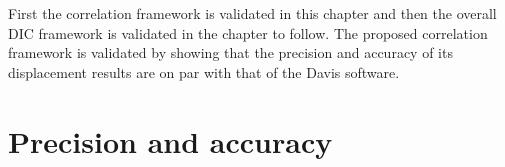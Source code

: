 \documentclass[12pt,oneside,openany,a4paper, %
english, %
masters-t, goldenblock]{usthesis}
\begin{document}
First the correlation framework is validated in this chapter and then the overall DIC framework is validated in the chapter to follow. The proposed correlation framework is validated by showing that the precision and accuracy of its displacement results are on par with that of the Davis software.






\section{Precision and accuracy}
\end{document}
